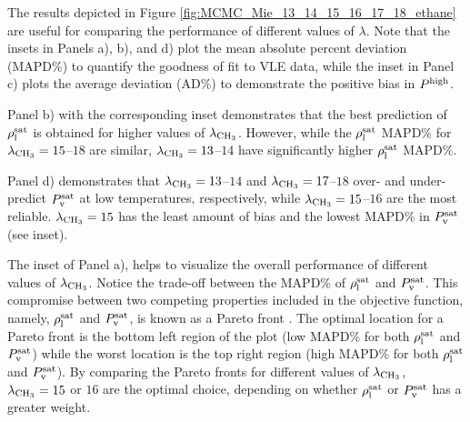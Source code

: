 \documentclass[journal=jctc,manuscript=article]{achemso}
\begin{document}

The results depicted in Figure \ref{fig:MCMC_Mie_13_14_15_16_17_18_ethane} are useful for comparing the performance of different values of $\lambda$. Note that the insets in Panels a), b), and d) plot the mean absolute percent deviation (MAPD\%) to quantify the goodness of fit to VLE data, while the inset in Panel c) plots the average deviation (AD\%) to demonstrate the positive bias in $P^{\rm high}$.

Panel b) with the corresponding inset demonstrates that the best prediction of $\rho_{\rm l}^{\rm sat}$ is obtained for higher values of $\lambda_{\rm CH_3}$. However, while the $\rho_{\rm l}^{\rm sat}$ MAPD\% for $\lambda_{\rm CH_3} = 15$--$18$ are similar, $\lambda_{\rm CH_3} = 13$--$14$ have significantly higher $\rho_{\rm l}^{\rm sat}$ MAPD\%. 

Panel d) demonstrates that $\lambda_{\rm CH_3} = 13$--$14$ and $\lambda_{\rm CH_3} = 17$--$18$ over- and under-predict $P_{\rm v}^{\rm sat}$ at low temperatures, respectively, 
while $\lambda_{\rm CH_3} = 15$--$16$ are the most reliable. $\lambda_{\rm CH_3} = 15$ has the least amount of bias and the lowest MAPD\% in $P_{\rm v}^{\rm sat}$ (see inset). 

The inset of Panel a), helps to visualize the overall performance of different values of $\lambda_{\rm CH_3}$. 
Notice the trade-off between the MAPD\% of $\rho_{\rm l}^{\rm sat}$ and $P_{\rm v}^{\rm sat}$. This compromise between two competing properties included in the objective function, namely, $\rho_{\rm l}^{\rm sat}$ and $P_{\rm v}^{\rm sat}$, is known as a Pareto front \cite{Pareto_Deriv,Pareto_LJPQ,Pareto_ST}. The optimal location for a Pareto front is the bottom left region of the plot (low MAPD\% for both $\rho_{\rm l}^{\rm sat}$ and $P_{\rm v}^{\rm sat}$) while the worst location is the top right region (high MAPD\% for both $\rho_{\rm l}^{\rm sat}$ and $P_{\rm v}^{\rm sat}$). By comparing the Pareto fronts for different values of $\lambda_{\rm CH_3}$, $\lambda_{\rm CH_3} = 15$ or $16$ are the optimal choice, depending on whether $\rho_{\rm l}^{\rm sat}$ or $P_{\rm v}^{\rm sat}$ has a greater weight.
\end{document}
